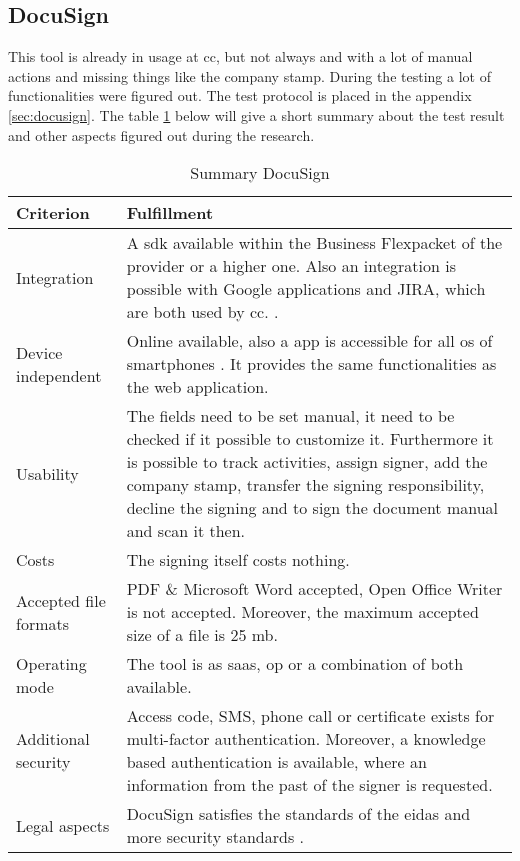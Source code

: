 \subsection{DocuSign}
This tool is already in usage at \gls{cc}, but not always and with a lot of manual actions and missing things like the company stamp. During the testing a lot of functionalities were figured out. The test protocol is placed in the appendix \ref{sec:docusign}. The table \ref{tab:docusign} below will give a short summary about the test result and other aspects figured out during the research.

\begin{table}[h!]
	
	\begin{tabular}{|p{4cm}|p{10cm}|} \hline
		Criterion & Fulfillment \\ \hline
		Integration &  A \gls{sdk} available within the \grqq Business Flex\grqq packet of the provider or a higher one. Also an integration is possible with Google applications and JIRA, which are both used by \gls{cc}. \parencite{docusign2018integration,docusign2018formats,docusign2018google,docusign2018jira}. \\ \hline
		Device independent & Online available, also a \gls{app} is accessible for all \gls{os} of smartphones \parencite{docusign2018mobile}. It provides the same functionalities as the web application. \\ \hline
		Usability &  The fields need to be set manual, it need to be checked if it possible to customize it. Furthermore it is possible to track activities, assign signer, add the company stamp, transfer the signing responsibility, decline the signing and to sign the document manual and scan it then. \\ \hline
		Costs & The signing itself costs nothing.\\ \hline
		Accepted file formats & PDF \& Microsoft Word accepted, Open Office Writer is not accepted. Moreover, the maximum accepted size of a file is 25 \gls{mb}. \parencite{docusign2018formats}\\ \hline
		Operating mode & The tool is as \gls{saas}, \gls{op} or a combination of both available. \parencite{docusign2018op,docusign2018saas} \\ \hline
		Additional security & Access code, SMS, phone call or certificate exists for multi-factor authentication. Moreover, a knowledge based authentication is available, where an information from the past of the signer is requested. \parencite{docusign2018security} \\ \hline
		Legal aspects & DocuSign satisfies the standards of the \gls{eidas} and more security standards \parencite{docusign2018certificates,docusign2018legal}. \\ \hline
	\end{tabular}
	\caption{Summary DocuSign}
	\label{tab:docusign}
\end{table}

